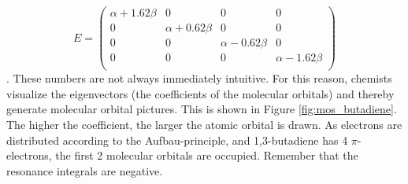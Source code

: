 \documentclass{article}
\begin{document}
%
\begin{equation}
E = 
\begin{pmatrix}
\alpha + 1.62\beta & 0 & 0 & 0 \\
0 & \alpha + 0.62\beta & 0 & 0  \\
0 & 0 & \alpha - 0.62\beta & 0 \\
0 & 0 & 0 & \alpha - 1.62\beta  \\

\end{pmatrix}
\end{equation}.
%
These numbers are not always immediately intuitive. For this reason, chemists visualize the eigenvectors (the coefficients of the molecular orbitals) and thereby generate molecular orbital pictures. This is shown in Figure \ref{fig:mos_butadiene}. The higher the coefficient, the larger the atomic orbital is drawn. As electrons are distributed according to the Aufbau-principle, and 1,3-butadiene has 4 $\pi$-electrons, the first 2 molecular orbitals are occupied. Remember that the resonance integrals are negative.
\end{document}
